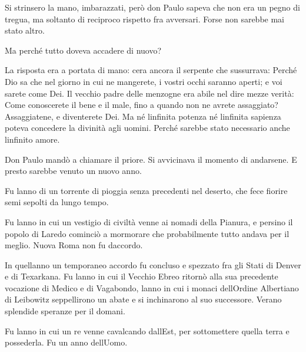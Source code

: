 Si strinsero la mano, imbarazzati, però don Paulo sapeva che non era un
pegno di tregua, ma soltanto di reciproco rispetto fra avversari. Forse
non sarebbe mai stato altro.

Ma perché tutto doveva accadere di nuovo?

La risposta era a portata di mano: c\textquotesingle era ancora il
serpente che sussurrava: Perché Dio sa che nel giorno in cui ne
mangerete, i vostri occhi saranno aperti; e voi sarete come Dei. Il
vecchio padre delle menzogne era abile nel dire mezze verità: Come
conoscerete il bene e il male, fino a quando non ne avrete assaggiato?
Assaggiatene, e diventerete Dei. Ma né l\textquotesingle infinita
potenza né l\textquotesingle infinita sapienza poteva concedere la
divinità agli uomini. Perché sarebbe stato necessario anche
l\textquotesingle infinito amore.

Don Paulo mandò a chiamare il priore. Si avvicinava il momento di
andarsene. E presto sarebbe venuto un nuovo anno.

Fu l\textquotesingle anno di un torrente di pioggia senza precedenti nel
deserto, che fece fiorire semi sepolti da lungo tempo.

Fu l\textquotesingle anno in cui un vestigio di civiltà venne ai nomadi
della Pianura, e persino il popolo di Laredo cominciò a mormorare che
probabilmente tutto andava per il meglio. Nuova Roma non fu
d\textquotesingle accordo.

In quell\textquotesingle anno un temporaneo accordo fu concluso e
spezzato fra gli Stati di Denver e di Texarkana. Fu
l\textquotesingle anno in cui il Vecchio Ebreo ritornò alla sua
precedente vocazione di Medico e di Vagabondo, l\textquotesingle anno in
cui i monaci dell\textquotesingle Ordine Albertiano di Leibowitz
seppellirono un abate e si inchinarono al suo successore.
V\textquotesingle erano splendide speranze per il domani.

Fu l\textquotesingle anno in cui un re venne cavalcando
dall\textquotesingle Est, per sottomettere quella terra e possederla. Fu
un anno dell\textquotesingle Uomo.
